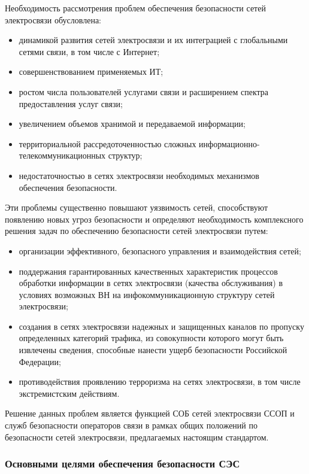 \documentclass[12pt, russian, oneside, article]{ncc}
\begin{document}
Необходимость рассмотрения проблем обеспечения безопасности сетей электросвязи обусловлена:
\begin{itemize}
\item динамикой развития сетей электросвязи и их интеграцией с глобальными сетями связи, в том числе с Интернет;
\item совершенствованием применяемых ИТ;
\item ростом числа пользователей услугами связи и расширением спектра предоставления услуг связи;
\item увеличением объемов хранимой и передаваемой информации;
\item территориальной рассредоточенностью сложных информационно-телекоммуникационных структур;
\item недостаточностью в сетях электросвязи необходимых механизмов обеспечения безопасности.
\end{itemize}

Эти проблемы существенно повышают уязвимость сетей, способствуют появлению новых угроз безопасности и определяют необходимость комплексного решения задач по обеспечению безопасности сетей электросвязи путем:
\begin{itemize}
\item организации эффективного, безопасного управления и взаимодействия сетей;
\item поддержания гарантированных качественных характеристик процессов обработки информации в сетях электросвязи (качества обслуживания) в условиях возможных ВН на инфокоммуникационную структуру сетей электросвязи;
\item создания в сетях электросвязи надежных и защищенных каналов по пропуску определенных категорий трафика, из совокупности которого могут быть извлечены сведения, способные нанести ущерб безопасности Российской Федерации;
\item противодействия проявлению терроризма на сетях электросвязи, в том числе экстремистским действиям.
\end{itemize}

Решение данных проблем является функцией СОБ сетей электросвязи ССОП и служб безопасности операторов связи в рамках общих положений по безопасности сетей электросвязи, предлагаемых настоящим стандартом.
\subsubsection{Основными целями обеспечения безопасности СЭС}
\label{sec-1_1_3}
\end{document}
